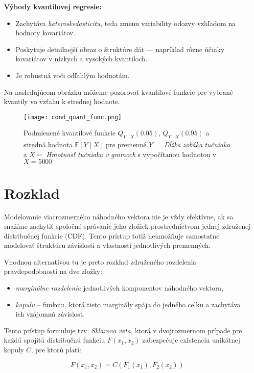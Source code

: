 \textbf{Výhody kvantilovej regresie:}
\begin{itemize}
  \item Zachytáva \textit{heteroskedasticitu}, teda zmenu variability odozvy vzhľadom na hodnoty kovariátov.
  \item Poskytuje detailnejší obraz o štruktúre dát — napríklad rôzne účinky kovariátov v nízkych a vysokých kvantiloch.
  \item Je robustná voči odľahlým hodnotám.
\end{itemize}

Na nasledujúcom obrázku môžeme pozorovať kvantilové funkcie pre vybrané kvantily vo vzťahu k strednej hodnote.

\begin{figure}[H]
    \centering
    \texttt{[image: cond\_quant\_func.png]}
    \caption{Podmienené kvantilové funkcie $Q_{Y \mid X}(0.05)$, $Q_{Y \mid X}(0.95)$ a stredná hodnota $\mathbb{E}[Y \mid X]$ pre premenné $Y=$ \textit{Dĺžka zobáka tučniaka} a $X=$ \textit{Hmotnosť tučniaka v gramoch} s vypočítanou hodnotou v $X=5000$}
    \label{fig:cond_quant_mean}
\end{figure}

\section{Rozklad}\label{sec:rozklad_kopule}

Modelovanie viacrozmerného náhodného vektora nie je vždy efektívne, ak sa snažíme zachytiť spoločné správanie jeho zložiek prostredníctvom jednej združenej distribučnej funkcie (CDF). Tento prístup totiž neumožňuje samostatne modelovať štruktúru závislosti a vlastností jednotlivých premenných.

Vhodnou alternatívou tu je preto rozklad združeného rozdelenia pravdepodobnosti na dve zložky:
\begin{itemize}
  \item \textit{marginálne rozdelenia} jednotlivých komponentov náhodného vektora,
  \item \textit{kopulu} – funkciu, ktorá tieto marginály spája do jedného celku a zachytáva ich vzájomnú závislosť.
\end{itemize}

Tento prístup formuluje tzv. \textit{Sklarova veta}, ktorá v dvojrozmernom prípade pre každú spojitú distribučnú funkciu $F(x_1, x_2)$ zabezpečuje existenciu unikátnej kopuly $C$, pre ktorú platí:

\begin{equation}\label{eq:copula_dist}
F(x_1, x_2) = C\left(F_1(x_1), F_2(x_2)\right)
\end{equation}


